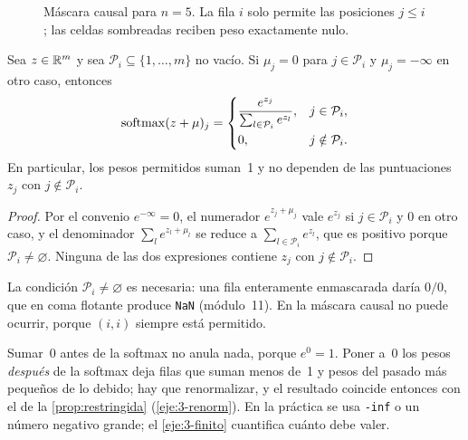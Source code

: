 \begin{figure}[h]
\centering
{}
\caption{Máscara causal para $n=5$. La fila $i$ solo permite las posiciones $j\le i$; las celdas sombreadas reciben peso exactamente nulo.}
\label{fig:causal}
\end{figure}

\begin{proposicion}\label{prop:restringida}
Sea $z\in\mathbb{R}^{m}$ y sea $\mathcal{P}_i\subseteq\{1,\dots,m\}$ no vacío. Si $\mu_j=0$ para $j\in\mathcal{P}_i$ y $\mu_j=-\infty$ en otro caso, entonces
\[
\operatorname{softmax}(z+\mu)_j=\begin{cases}\dfrac{e^{z_j}}{\sum_{l\in\mathcal{P}_i}e^{z_l}},& j\in\mathcal{P}_i,\\[2ex] 0,& j\notin\mathcal{P}_i.\end{cases}
\]
En particular, los pesos permitidos suman~1 y no dependen de las puntuaciones $z_j$ con $j\notin\mathcal{P}_i$.
\end{proposicion}

\begin{proof}
Por el convenio $e^{-\infty}=0$, el numerador $e^{z_j+\mu_j}$ vale $e^{z_j}$ si $j\in\mathcal{P}_i$ y $0$ en otro caso, y el denominador $\sum_le^{z_l+\mu_l}$ se reduce a $\sum_{l\in\mathcal{P}_i}e^{z_l}$, que es positivo porque $\mathcal{P}_i\ne\varnothing$. Ninguna de las dos expresiones contiene $z_j$ con $j\notin\mathcal{P}_i$.
\end{proof}

La condición $\mathcal{P}_i\ne\varnothing$ es necesaria: una fila enteramente enmascarada daría $0/0$, que en coma flotante produce \texttt{NaN} (módulo~11). En la máscara causal no puede ocurrir, porque $(i,i)$ siempre está permitido.

\begin{observacion}
Sumar~0 antes de la softmax no anula nada, porque $e^{0}=1$. Poner a~0 los pesos \emph{después} de la softmax deja filas que suman menos de~1 y pesos del pasado más pequeños de lo debido; hay que renormalizar, y el resultado coincide entonces con el de la \cref{prop:restringida} (\cref{eje:3-renorm}). En la práctica se usa \texttt{-inf} o un número negativo grande; el \cref{eje:3-finito} cuantifica cuánto debe valer.
\end{observacion}

